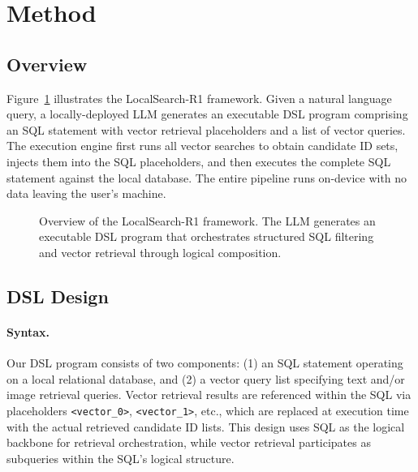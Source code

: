 \documentclass[11pt]{article}
\begin{document}
\section{Method}
\label{sec:method}

\subsection{Overview}
\label{sec:overview}

Figure~\ref{fig:overview} illustrates the LocalSearch-R1 framework.
Given a natural language query, a locally-deployed LLM generates an executable DSL program comprising an SQL statement with vector retrieval placeholders and a list of vector queries.
The execution engine first runs all vector searches to obtain candidate ID sets, injects them into the SQL placeholders, and then executes the complete SQL statement against the local database.
The entire pipeline runs on-device with no data leaving the user's machine.

\begin{figure}[t]
\centering
\caption{Overview of the LocalSearch-R1 framework. The LLM generates an executable DSL program that orchestrates structured SQL filtering and vector retrieval through logical composition.}
\label{fig:overview}
\end{figure}


\subsection{DSL Design}
\label{sec:dsl_design}

\paragraph{Syntax.}
Our DSL program consists of two components: (1) an SQL statement operating on a local relational database, and (2) a vector query list specifying text and/or image retrieval queries.
Vector retrieval results are referenced within the SQL via placeholders \texttt{<vector\_0>}, \texttt{<vector\_1>}, etc., which are replaced at execution time with the actual retrieved candidate ID lists.
This design uses SQL as the logical backbone for retrieval orchestration, while vector retrieval participates as subqueries within the SQL's logical structure.
\end{document}
